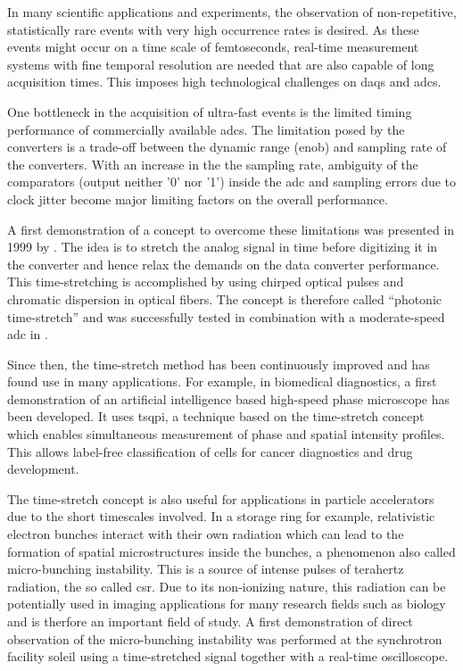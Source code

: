 In many scientific applications and experiments, the observation of non-repetitive, statistically rare events with very high occurrence rates is desired.
As these events might occur on a time scale of femtoseconds, real-time measurement systems with fine temporal resolution are needed that are also capable of long acquisition times.
This imposes high technological challenges on \glspl{daq} and \glspl{adc}.

One bottleneck in the acquisition of ultra-fast events is the limited timing performance of commercially available \glspl{adc}. 
The limitation posed by the converters is a trade-off between the dynamic range (\gls{enob}) and sampling rate of the converters.
With an increase in the the sampling rate, ambiguity of the comparators (output neither '0' nor '1') inside the \gls{adc} and sampling errors due to clock jitter become major limiting factors on the overall performance. \cite{Mahjoubfar2017}

A first demonstration of a concept to overcome these limitations was presented in 1999 by \cite{ts_adc}. 
The idea is to stretch the analog signal in time before digitizing it in the converter and hence relax the demands on the data converter performance. 
This time-stretching is accomplished by using chirped optical pulses and chromatic dispersion in optical fibers.
The concept is therefore called ``photonic time-stretch'' and was successfully tested in combination with a moderate-speed \gls{adc} in \cite{ts_adc}.

Since then, the time-stretch method has been continuously improved and has found use in many applications.
For example, in biomedical diagnostics, a first demonstration of an artificial intelligence based high-speed phase microscope has been developed. 
It uses \gls{tsqpi}, a technique based on the time-stretch concept which enables simultaneous measurement of phase and spatial intensity profiles.
This allows label-free classification of cells for cancer diagnostics and drug development. \cite{Mahjoubfar2017} 

The time-stretch concept is also useful for applications in particle accelerators due to the short timescales involved.
In a storage ring for example, relativistic electron bunches interact with their own radiation which can lead to the formation of spatial microstructures inside the bunches, a phenomenon also called micro-bunching instability.
This is a source of intense pulses of terahertz radiation, the so called \gls{csr}. 
Due to its non-ionizing nature, this radiation can be potentially used in imaging applications for many research fields such as biology and is therfore an important field of study. 
A first demonstration of direct observation of the micro-bunching instability was performed at the synchrotron facility \gls{soleil} using a time-stretched signal together with a real-time oscilloscope. \cite{Roussel2015}

